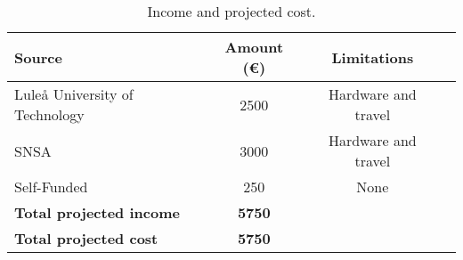 \begin{table}[H]
\centering
\begin{tabular}{|l|c|c|c|} 
\hline
Source & Amount (\euro) & Limitations   \\ 
\hline
Luleå University of Technology & 2500 & Hardware and travel \\
SNSA & 3000 & Hardware and travel \\
Self-Funded & 250 & None\\
\hline
\textbf{Total projected income} & \textbf{5750} & \\
\hline
\bf{Total projected cost} & \bf{5750} & \\
\hline
\end{tabular}
\caption{Income and projected cost.}
\label{table:income-and-cost}
\end{table}

\raggedbottom